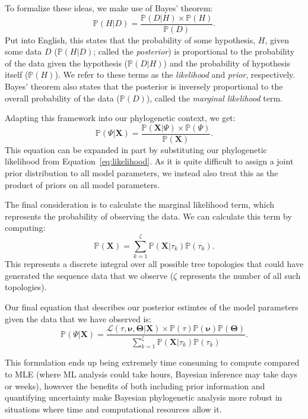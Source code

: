 To formalize these ideas, we make use of Bayes' theorem:
\begin{equation}
  \mathbb{P}(H|D) = \frac{\mathbb{P}(D|H) \times \mathbb{P}(H)}{\mathbb{P}(D)}.
\end{equation}
Put into English, this states that the probability of some hypothesis, $H$, given some data $D$ ($\mathbb{P}(H|D)$; called the \textit{posterior}) is proportional to the probability of the data given the hypothesis ($\mathbb{P}(D|H)$) and the probability of hypothesis itself ($\mathbb{P}(H)$).
We refer to these terms as the \textit{likelihood} and \textit{prior}, respectively.
Bayes' theorem also states that the posterior is inversely proportional to the overall probability of the data ($\mathbb{P}(D)$), called the \textit{marginal likelihood} term.

Adapting this framework into our phylogenetic context, we get:
\begin{equation}
  \mathbb{P}(\Psi|\mathbf{X}) = \frac{\mathbb{P}(\mathbf{X}|\Psi) \times \mathbb{P}(\Psi)}{\mathbb{P}(\mathbf{X})}.
\end{equation}
This equation can be expanded in part by substituting our phylogenetic likelihood from Equation~\ref{eq:likelihood}.
As it is quite difficult to assign a joint prior distribution to all model parameters, we instead also treat this as the product of priors on all model parameters.

The final consideration is to calculate the marginal likelihood term, which represents the probability of observing the data.
We can calculate this term by computing:
\begin{equation}
  \mathbb{P}(\mathbf{X}) = \sum_{k=1}^{\zeta} \mathbb{P}(\mathbf{X}|\tau_k)\mathbb{P}(\tau_k).
\end{equation}
This represents a discrete integral over all possible tree topologies that could have generated the sequence data that we observe ($\zeta$ represents the number of all such topologies).

Our final equation that describes our posterior estimtes of the model parameters given the data that we have observed is:
\begin{equation}
  \mathbb{P}(\Psi|\mathbf{X}) = 
    \frac{\mathcal{L}(\tau,\mathbf{\nu},\mathbf{\Theta}|\mathbf{X}) \times \mathbb{P}(\tau)\mathbb{P}(\mathbf{\nu})\mathbb{P}(\mathbf{\Theta})}
    {\sum_{k=1}^{\zeta} \mathbb{P}(\mathbf{X}|\tau_k)\mathbb{P}(\tau_k)}.
\end{equation}

This formulation ends up being extremely time consuming to compute compared to MLE (where ML analysis could take hours, Bayesian inference may take days or weeks), however the benefits of both including prior information and quantifying uncertainty make Bayesian phylogenetic analysis more robust in situations where time and computational resources allow it.

